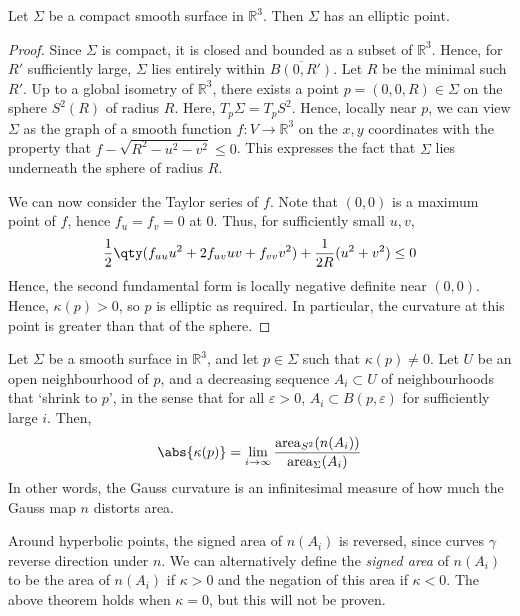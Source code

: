 \begin{proposition}
	Let $\Sigma$ be a compact smooth surface in $\mathbb R^3$.
	Then $\Sigma$ has an elliptic point.
\end{proposition}
\begin{proof}
	Since $\Sigma$ is compact, it is closed and bounded as a subset of $\mathbb R^3$.
	Hence, for $R'$ sufficiently large, $\Sigma$ lies entirely within $\overline{B(0,R')}$.
	Let $R$ be the minimal such $R'$.
	Up to a global isometry of $\mathbb R^3$, there exists a point $p = (0,0,R) \in \Sigma$ on the sphere $S^2(R)$ of radius $R$.
	Here, $T_p \Sigma = T_p S^2$.
	Hence, locally near $p$, we can view $\Sigma$ as the graph of a smooth function $f \colon V \to \mathbb R^3$ on the $x, y$ coordinates with the property that $f - \sqrt{R^2 - u^2 - v^2} \leq 0$.
	This expresses the fact that $\Sigma$ lies underneath the sphere of radius $R$.

	We can now consider the Taylor series of $f$.
	Note that $(0,0)$ is a maximum point of $f$, hence $f_u = f_v = 0$ at $0$.
	Thus, for sufficiently small $u,v$,
	\begin{align*}
		\frac{1}{2} \qty(f_{uu} u^2 + 2f_{uv} uv + f_{vv} v^2) + \frac{1}{2R} (u^2 + v^2) \leq 0
	\end{align*}
	Hence, the second fundamental form is locally negative definite near $(0,0)$.
	Hence, $\kappa(p) > 0$, so $p$ is elliptic as required.
	In particular, the curvature at this point is greater than that of the sphere.
\end{proof}
\begin{theorem}
	Let $\Sigma$ be a smooth surface in $\mathbb R^3$, and let $p \in \Sigma$ such that $\kappa(p) \neq 0$.
	Let $U$ be an open neighbourhood of $p$, and a decreasing sequence $A_i \subset U$ of neighbourhoods that `shrink to $p$', in the sense that for all $\varepsilon > 0$, $A_i \subset B(p,\varepsilon)$ for sufficiently large $i$.
	Then,
	\begin{align*}
		\abs{\kappa(p)} = \lim_{i \to \infty} \frac{\mathrm{area}_{S^2} (n(A_i))}{\mathrm{area}_{\Sigma} (A_i)}
	\end{align*}
	In other words, the Gauss curvature is an infinitesimal measure of how much the Gauss map $n$ distorts area.
\end{theorem}
\begin{remark}
	Around hyperbolic points, the signed area of $n(A_i)$ is reversed, since curves $\gamma$ reverse direction under $n$.
	We can alternatively define the \textit{signed area} of $n(A_i)$ to be the area of $n(A_i)$ if $\kappa > 0$ and the negation of this area if $\kappa < 0$.
	The above theorem holds when $\kappa = 0$, but this will not be proven.
\end{remark}
